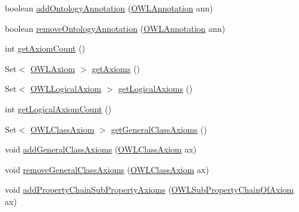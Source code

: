 \begin{DoxyCompactItemize}
\item 
boolean \hyperlink{classuk_1_1ac_1_1manchester_1_1cs_1_1owl_1_1owlapi_1_1_internals_impl_a92f3729f5a4620e02b1215f6084104b7}{add\-Ontology\-Annotation} (\hyperlink{interfaceorg_1_1semanticweb_1_1owlapi_1_1model_1_1_o_w_l_annotation}{O\-W\-L\-Annotation} ann)
\item 
boolean \hyperlink{classuk_1_1ac_1_1manchester_1_1cs_1_1owl_1_1owlapi_1_1_internals_impl_a4d01e68b2af5e0db9e343cf31eda52c3}{remove\-Ontology\-Annotation} (\hyperlink{interfaceorg_1_1semanticweb_1_1owlapi_1_1model_1_1_o_w_l_annotation}{O\-W\-L\-Annotation} ann)
\item 
int \hyperlink{classuk_1_1ac_1_1manchester_1_1cs_1_1owl_1_1owlapi_1_1_internals_impl_aff77e20d85ababcb19a23ab910d06c3f}{get\-Axiom\-Count} ()
\item 
Set$<$ \hyperlink{interfaceorg_1_1semanticweb_1_1owlapi_1_1model_1_1_o_w_l_axiom}{O\-W\-L\-Axiom} $>$ \hyperlink{classuk_1_1ac_1_1manchester_1_1cs_1_1owl_1_1owlapi_1_1_internals_impl_a32137213284233b886dbfc01b42a2a1f}{get\-Axioms} ()
\item 
Set$<$ \hyperlink{interfaceorg_1_1semanticweb_1_1owlapi_1_1model_1_1_o_w_l_logical_axiom}{O\-W\-L\-Logical\-Axiom} $>$ \hyperlink{classuk_1_1ac_1_1manchester_1_1cs_1_1owl_1_1owlapi_1_1_internals_impl_afbacd94241c167b62c7720c061273a0a}{get\-Logical\-Axioms} ()
\item 
int \hyperlink{classuk_1_1ac_1_1manchester_1_1cs_1_1owl_1_1owlapi_1_1_internals_impl_a05d50ed373e35f41689298db8958f352}{get\-Logical\-Axiom\-Count} ()
\item 
Set$<$ \hyperlink{interfaceorg_1_1semanticweb_1_1owlapi_1_1model_1_1_o_w_l_class_axiom}{O\-W\-L\-Class\-Axiom} $>$ \hyperlink{classuk_1_1ac_1_1manchester_1_1cs_1_1owl_1_1owlapi_1_1_internals_impl_a6181cc77048d2892bda81f8811550d6d}{get\-General\-Class\-Axioms} ()
\item 
void \hyperlink{classuk_1_1ac_1_1manchester_1_1cs_1_1owl_1_1owlapi_1_1_internals_impl_a451a03bfe4e7764668b9ac61128c15c9}{add\-General\-Class\-Axioms} (\hyperlink{interfaceorg_1_1semanticweb_1_1owlapi_1_1model_1_1_o_w_l_class_axiom}{O\-W\-L\-Class\-Axiom} ax)
\item 
void \hyperlink{classuk_1_1ac_1_1manchester_1_1cs_1_1owl_1_1owlapi_1_1_internals_impl_aacf9d5f0a26e05402dfe2cac18d4507a}{remove\-General\-Class\-Axioms} (\hyperlink{interfaceorg_1_1semanticweb_1_1owlapi_1_1model_1_1_o_w_l_class_axiom}{O\-W\-L\-Class\-Axiom} ax)
\item 
void \hyperlink{classuk_1_1ac_1_1manchester_1_1cs_1_1owl_1_1owlapi_1_1_internals_impl_a8973c233879490e3448859cdd9adc46c}{add\-Property\-Chain\-Sub\-Property\-Axioms} (\hyperlink{interfaceorg_1_1semanticweb_1_1owlapi_1_1model_1_1_o_w_l_sub_property_chain_of_axiom}{O\-W\-L\-Sub\-Property\-Chain\-Of\-Axiom} ax)

\end{DoxyCompactItemize}
